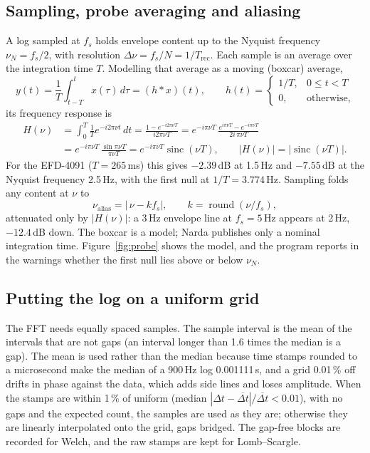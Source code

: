 \documentclass[10pt,letterpaper]{article}
\numberwithin{equation}{section}
\DeclareMathOperator{\sinc}{sinc}
\begin{document}
\subsection{Sampling, probe averaging and aliasing}\label{sec:sinc}
A log sampled at $f_s$ holds envelope content up to the Nyquist frequency
$\nu_N = f_s/2$, with resolution $\Delta\nu = f_s/N = 1/T_\mathrm{rec}$. Each
sample is an average over the integration time $T$. Modelling that average as
a moving (boxcar) average,
\begin{equation}
y(t) = \frac{1}{T}\int_{t-T}^{t} x(\tau)\,d\tau = (h * x)(t),\qquad
h(t) = \begin{cases} 1/T, & 0 \le t < T\\ 0, & \text{otherwise,}\end{cases}
\end{equation}
its frequency response is
\begin{align}
H(\nu) &= \int_0^T \frac{1}{T} e^{-i2\pi\nu t}\,dt
 = \frac{1 - e^{-i2\pi\nu T}}{i2\pi\nu T}
 = e^{-i\pi\nu T}\,\frac{e^{i\pi\nu T} - e^{-i\pi\nu T}}{2i\,\pi\nu T} \nonumber\\
&= e^{-i\pi\nu T}\,\frac{\sin \pi\nu T}{\pi\nu T} = e^{-i\pi\nu T}\sinc(\nu T),
\qquad |H(\nu)| = |\sinc(\nu T)|.
\label{eq:sinc}
\end{align}
For the EFD-4091 ($T = 265$\,ms) this gives $-2.39$\,dB at 1.5\,Hz and
$-7.55$\,dB at the Nyquist frequency 2.5\,Hz, with the first null at
$1/T = 3.774$\,Hz. Sampling folds any content at $\nu$ to
\begin{equation}
\nu_\mathrm{alias} = \left|\,\nu - k f_s\right|,\qquad k = \operatorname{round}(\nu/f_s),
\end{equation}
attenuated only by $|H(\nu)|$: a 3\,Hz envelope line at $f_s = 5$\,Hz appears
at 2\,Hz, $-12.4$\,dB down. The boxcar is a model; Narda publishes only a
nominal integration time. Figure~\ref{fig:probe} shows the model, and the
program reports in the warnings whether the first null lies above or below
$\nu_N$.

\subsection{Putting the log on a uniform grid}\label{sec:grid}
The FFT needs equally spaced samples. The sample interval is the mean of the
intervals that are not gaps (an interval longer than 1.6 times the median
is a gap). The mean is used rather than the median because time stamps
rounded to a microsecond make the median of a 900\,Hz log 0.001111\,s, and a
grid 0.01\,\% off drifts in phase against the data, which adds side lines and
loses amplitude. When the stamps are within 1\,\% of uniform (median
$|\Delta t - \overline{\Delta t}|/\overline{\Delta t} < 0.01$), with no gaps and the
expected count, the samples are used as they are; otherwise they are linearly
interpolated onto the grid, gaps bridged. The gap-free blocks are recorded for
Welch, and the raw stamps are kept for Lomb--Scargle.
\end{document}
